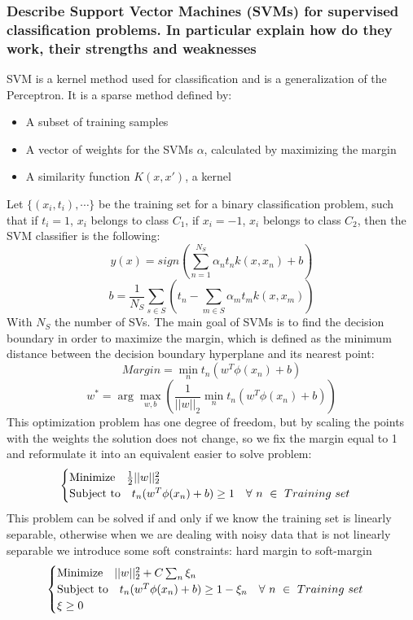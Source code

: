 \subsubsection{Describe Support Vector Machines (SVMs) for supervised classification problems. In particular explain how do they work, their strengths and weaknesses}
    SVM is a kernel method used for classification and is a generalization of the Perceptron. It is a sparse method defined by:
    \begin{itemize}
        \item A subset of training samples
        \item A vector of weights for the SVMs $\alpha$, calculated by maximizing the margin
        \item A similarity function $K(x,x')$, a kernel
    \end{itemize}
    Let $\{(x_i,t_i),\cdots\}$ be the training set for a binary classification problem, such that if $t_i=1$, $x_i$ belongs to class $C_1$, if $x_i=-1$, $x_i$ belongs to class $C_2$, then the SVM classifier is the following:
    $$y(x)=sign\left(\sum_{n=1}^{N_S}\alpha_nt_nk(x,x_n)+b\right)$$
    $$b = \frac{1}{N_S} \sum _{s \in S} \left(t_n - \sum _ {m \in S} \alpha_m t_m k(x, x_m)\right)$$
    With $N_S$ the number of SVs. The main goal of SVMs is to find the decision boundary in order to maximize the margin, which is defined as the minimum distance between the decision boundary hyperplane and its nearest point:
    $$Margin=\min_nt_n(w^T\phi(x_n)+b)$$
    $$w^*=\arg\max_{w,b}\left(\frac{1}{||w||_2}\min_nt_n(w^T\phi(x_n)+b)\right)$$
    This optimization problem has one degree of freedom, but by scaling the points with the weights the solution does not change, so we fix the margin equal to 1 and reformulate it into an equivalent easier to solve problem:
    $$
    \begin{cases}
        \text{Minimize\hspace{1em}}\frac{1}{2}||w||^2_2\\
        \text{Subject to\hspace{1em}}t_n(w^T\phi(x_n)+b)\geq 1\hspace{1em}\forall\,\,n\,\,\in\,\,Training\,\,set
    \end{cases}
    $$
    This problem can be solved if and only if we know the training set is linearly separable, otherwise when we are dealing with noisy data that is not linearly separable we introduce some soft constraints: hard margin to soft-margin
    $$
    \begin{cases}
        \text{Minimize\hspace{1em}}||w||^2_2+C\sum_n\xi_n\\
        \text{Subject to\hspace{1em}}t_n(w^T\phi(x_n)+b)\geq 1-\xi_n\hspace{1em}\forall\,\,n\,\,\in\,\,Training\,\,set\\
        \xi\geq 0
    \end{cases}
    $$
